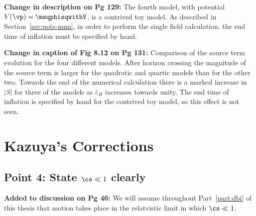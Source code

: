 \textbf{Change in description on Pg 129:}
The fourth model, with potential $V(\vp)=\msqphisqwithV$, is a contrived toy model.
As described in Section~\ref{sec:pots-num}, in order to perform the single field
calculation, the end time of inflation must be specified by hand. 

\textbf{Change in caption of Fig 8.12 on Pg 131:}
Comparison of the
source term
evolution for the four different models. After horizon crossing the magnitude of the
source term is larger for the quadratic and quartic models than for the other two.
Towards the end of the numerical calculation there is a marked increase in $|S|$ for
three of the models as $\bar{\varepsilon}_H$ increases towards unity. The end time of
inflation is specified by hand for the contrived toy model, so this effect is
not seen.

\section{Kazuya's Corrections}
\subsection{Point 4: State $\cs\ll 1$ clearly}
\textbf{Added to discussion on Pg 46:}
We will assume throughout Part~\ref{part:dbi} of this thesis that motion takes
place in the relatvistic limit in which $\cs\ll1$.

